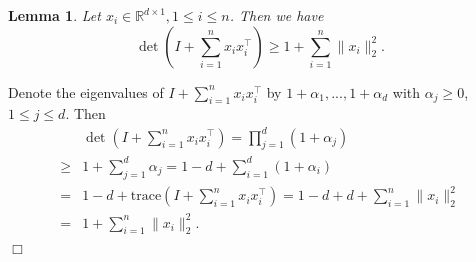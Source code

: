 \documentclass{article}
\newcommand{\RR}{\mathbb{R}}
\newcommand{\trace}{\mathrm{trace}}
\newcommand{\norm}[1]{\| #1 \|}
\newtheorem{lemma}[theorem]{Lemma}%
\newenvironment{proof}{\noindent {\textbf{Proof. }}}{$\Box$ \medskip}
\begin{document}
\begin{lemma} %
  \label{lem:detTech}
  Let $x_i \in \RR^{d \times 1}, 1 \leq i \leq n$. Then we have
  $$
    \det\left(I + \sum_{i=1}^n x_i x_i^{\top}\right) \geq 1 + \sum_{i=1}^n \norm{x_i}_2^2.
  $$
\end{lemma}
\begin{proof}
  Denote the eigenvalues of $I + \sum_{i=1}^n x_i x_i^{\top}$ by $1+\alpha_1,...,1+\alpha_d$ with $\alpha_j \geq 0$, $1\leq j\leq d$. Then
  \begin{align*}
    &\det(I + \sum_{i=1}^n x_i x_i^{\top})= \prod_{j=1}^d (1 + \alpha_j)\\
    \geq& 1 +\sum_{j=1}^d \alpha_j =1-d + \sum_{i=1}^d (1+\alpha_i) \\
    =&1-d + \trace(I + \sum_{i=1}^n x_i x_i^{\top})= 1-d + d + \sum_{i=1}^n \norm{x_i}_2^2\\
    =&1 + \sum_{i=1}^n \norm{x_i}_2^2.
  \end{align*}
\end{proof}
\end{document}

